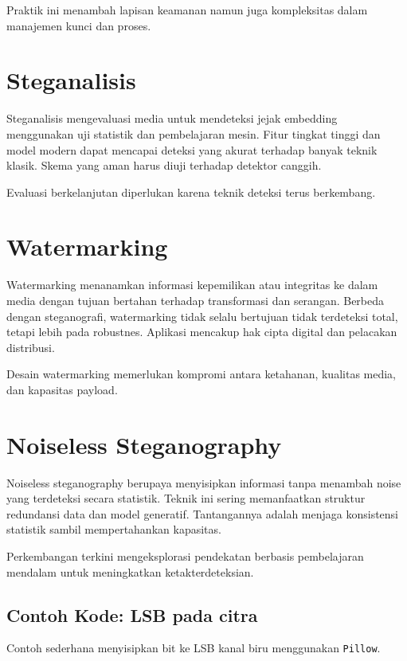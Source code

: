 \documentclass[../main.tex]{subfiles}
\begin{document}
Praktik ini menambah lapisan keamanan namun juga kompleksitas dalam manajemen kunci dan proses.

\section{Steganalisis}
Steganalisis mengevaluasi media untuk mendeteksi jejak embedding menggunakan uji statistik dan pembelajaran mesin. Fitur tingkat tinggi dan model modern dapat mencapai deteksi yang akurat terhadap banyak teknik klasik. Skema yang aman harus diuji terhadap detektor canggih.

Evaluasi berkelanjutan diperlukan karena teknik deteksi terus berkembang.

\section{Watermarking}
Watermarking menanamkan informasi kepemilikan atau integritas ke dalam media dengan tujuan bertahan terhadap transformasi dan serangan. Berbeda dengan steganografi, watermarking tidak selalu bertujuan tidak terdeteksi total, tetapi lebih pada robustnes. Aplikasi mencakup hak cipta digital dan pelacakan distribusi.

Desain watermarking memerlukan kompromi antara ketahanan, kualitas media, dan kapasitas payload.

\section{Noiseless Steganography}
Noiseless steganography berupaya menyisipkan informasi tanpa menambah noise yang terdeteksi secara statistik. Teknik ini sering memanfaatkan struktur redundansi data dan model generatif. Tantangannya adalah menjaga konsistensi statistik sambil mempertahankan kapasitas.

Perkembangan terkini mengeksplorasi pendekatan berbasis pembelajaran mendalam untuk meningkatkan ketakterdeteksian.

\subsection{Contoh Kode: LSB pada citra}
Contoh sederhana menyisipkan bit ke LSB kanal biru menggunakan \texttt{Pillow}.
\end{document}
